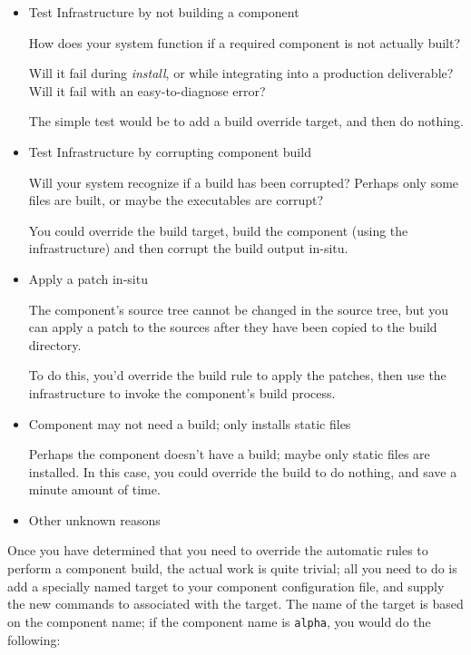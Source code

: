 \begin{itemize}
\item Test \bni Infrastructure by not building a component

  How does your \bni system function if a required component is not
  actually built?

  Will it fail during \emph{install}, or while integrating into a
  production deliverable?  Will it fail with an easy-to-diagnose
  error?

  The simple test would be to add a build override target, and then do
  nothing.

\item Test \bni Infrastructure by corrupting component build

  Will your \bni system recognize if a build has been corrupted?
  Perhaps only some files are built, or maybe the executables are
  corrupt?

  You could override the build target, build the component (using the
  \lmsbw infrastructure) and then corrupt the build output in-situ.

\item Apply a patch in-situ

  The component's source tree cannot be changed in the source tree,
  but you can apply a patch to the sources after they have been copied
  to the build directory.

  To do this, you'd override the build rule to apply the patches, then
  use the \lmsbw infrastructure to invoke the component's build
  process.

\item Component may not need a build; only installs static files

  Perhaps the component doesn't have a build; maybe only static files
  are installed.  In this case, you could override the build to do
  nothing, and save a minute amount of time.

\item Other unknown reasons
\end{itemize}

Once you have determined that you need to override the automatic rules
to perform a component build, the actual work is quite trivial; all
you need to do is add a specially named \makefile target to your
component configuration file, and supply the new commands to
associated with the target.  The name of the target is based on the
component name; if the component name is \texttt{alpha}, you would do
the following:

